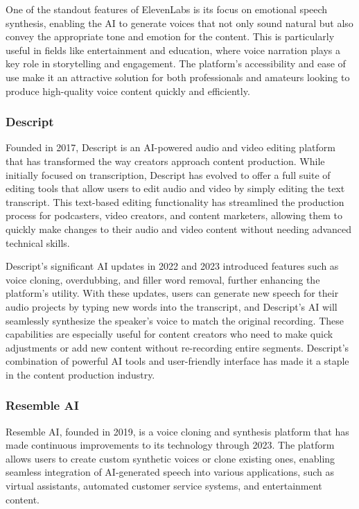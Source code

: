 One of the standout features of ElevenLabs is its focus on emotional speech synthesis, enabling the AI to generate voices that not only sound natural but also convey the appropriate tone and emotion for the content. 
This is particularly useful in fields like entertainment and education, where voice narration plays a key role in storytelling and engagement. 
The platform’s accessibility and ease of use make it an attractive solution for both professionals and amateurs looking to produce high-quality voice content quickly and efficiently.

\subsubsection{Descript}

Founded in 2017, Descript is an AI-powered audio and video editing platform that has transformed the way creators approach content production. 
While initially focused on transcription, Descript has evolved to offer a full suite of editing tools that allow users to edit audio and video by simply editing the text transcript. 
This text-based editing functionality has streamlined the production process for podcasters, video creators, and content marketers, allowing them to quickly make changes to their audio and video content without needing advanced technical skills.

Descript’s significant AI updates in 2022 and 2023 introduced features such as voice cloning, overdubbing, and filler word removal, further enhancing the platform’s utility. 
With these updates, users can generate new speech for their audio projects by typing new words into the transcript, and Descript’s AI will seamlessly synthesize the speaker’s voice to match the original recording. 
These capabilities are especially useful for content creators who need to make quick adjustments or add new content without re-recording entire segments. 
Descript’s combination of powerful AI tools and user-friendly interface has made it a staple in the content production industry.

\subsubsection{Resemble AI}

Resemble AI, founded in 2019, is a voice cloning and synthesis platform that has made continuous improvements to its technology through 2023. 
The platform allows users to create custom synthetic voices or clone existing ones, enabling seamless integration of AI-generated speech into various applications, such as virtual assistants, automated customer service systems, and entertainment content.

